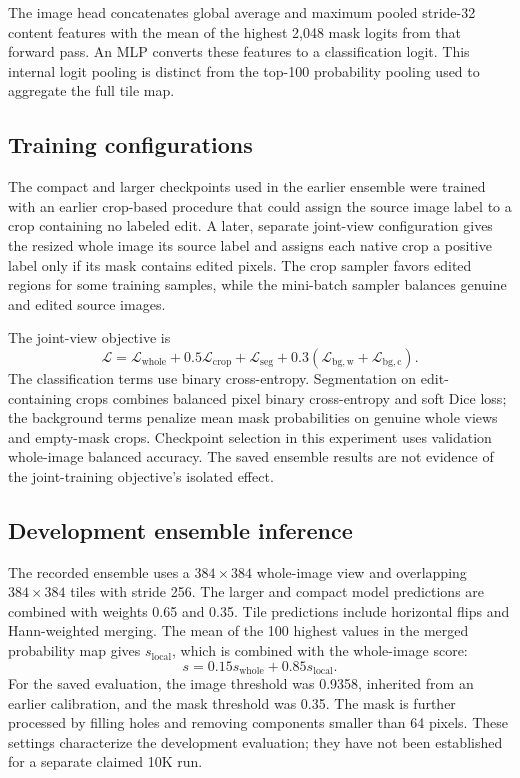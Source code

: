 The image head concatenates global average and maximum pooled stride-32 content features with the mean of the highest 2,048 mask logits from that forward pass. An MLP converts these features to a classification logit. This internal logit pooling is distinct from the top-100 probability pooling used to aggregate the full tile map.

\subsection{Training configurations}
The compact and larger checkpoints used in the earlier ensemble were trained with an earlier crop-based procedure that could assign the source image label to a crop containing no labeled edit. A later, separate joint-view configuration gives the resized whole image its source label and assigns each native crop a positive label only if its mask contains edited pixels. The crop sampler favors edited regions for some training samples, while the mini-batch sampler balances genuine and edited source images.

The joint-view objective is
\begin{equation}
\mathcal{L}=\mathcal{L}_{\mathrm{whole}}+0.5\mathcal{L}_{\mathrm{crop}}+\mathcal{L}_{\mathrm{seg}}+0.3(\mathcal{L}_{\mathrm{bg,w}}+\mathcal{L}_{\mathrm{bg,c}}).
\end{equation}
The classification terms use binary cross-entropy. Segmentation on edit-containing crops combines balanced pixel binary cross-entropy and soft Dice loss; the background terms penalize mean mask probabilities on genuine whole views and empty-mask crops. Checkpoint selection in this experiment uses validation whole-image balanced accuracy. The saved ensemble results are not evidence of the joint-training objective's isolated effect.

\subsection{Development ensemble inference}
The recorded ensemble uses a $384\times384$ whole-image view and overlapping $384\times384$ tiles with stride 256. The larger and compact model predictions are combined with weights 0.65 and 0.35. Tile predictions include horizontal flips and Hann-weighted merging. The mean of the 100 highest values in the merged probability map gives $s_{\mathrm{local}}$, which is combined with the whole-image score:
\begin{equation}
 s = 0.15s_{\mathrm{whole}}+0.85s_{\mathrm{local}}.
\end{equation}
For the saved evaluation, the image threshold was 0.9358, inherited from an earlier calibration, and the mask threshold was 0.35. The mask is further processed by filling holes and removing components smaller than 64 pixels. These settings characterize the development evaluation; they have not been established for a separate claimed 10K run.
